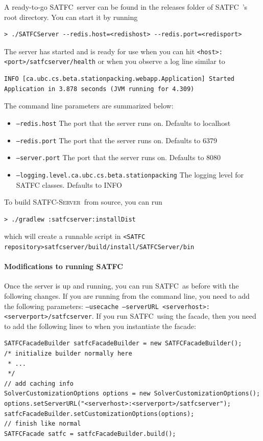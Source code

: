 \documentclass[
10pt, %
letterpaper, %
oneside, %
headinclude,footinclude, %
BCOR5mm, %
needspace, %
]{scrartcl}
\newcommand{\SATFC}{\textsc{SATFC}~}
\newcommand{\SATFCServer}{\textsc{SATFC-Server}~}
\begin{document}
A ready-to-go \SATFC server can be found in the releases folder of \SATFC's root directory. You can start it by running
\begin{lstlisting}[style=Bash]
> ./SATFCServer --redis.host=<redishost> --redis.port=<redisport>
\end{lstlisting}
The server has started and is ready for use when you can hit \texttt{<host>:<port>/satfcserver/health} or when you observe a log line similar to 
\begin{lstlisting}[style=Bash]
INFO [ca.ubc.cs.beta.stationpacking.webapp.Application] Started Application in 3.878 seconds (JVM running for 4.309)
\end{lstlisting}
The command line parameters are summarized below:
\begin{itemize}
\item \texttt{---redis.host} The port that the server runs on. Defaults to localhost
\item \texttt{---redis.port} The port that the server runs on. Defaults to 6379
\item \texttt{---server.port} The port that the server runs on. Defaults to 8080
\item \texttt{---logging.level.ca.ubc.cs.beta.stationpacking} The logging level for SATFC classes. Defaults to INFO
\end{itemize}
To build \SATFCServer from source, you can run 
\begin{lstlisting}[style=Bash]
> ./gradlew :satfcserver:installDist
\end{lstlisting}
which will create a runnable script in \texttt{<SATFC repository>satfcserver/build/install/SATFCServer/bin}

\paragraph{Modifications to running \SATFC}
Once the server is up and running, you can run \SATFC as before with the following changes. If you are running from the command line, you need to add the following parameters: \texttt{---usecache ---serverURL <serverhost>:<serverport>/satfcserver}. If you run \SATFC using the facade, then you need to add the following lines to when you instantiate the facade:

\begin{verbatim}
SATFCFacadeBuilder satfcFacadeBuilder = new SATFCFacadeBuilder();
/* initialize builder normally here
 * ...
 */
// add caching info
SolverCustomizationOptions options = new SolverCustomizationOptions();
options.setServerURL("<serverhost>:<serverport>/satfcserver");
satfcFacadeBuilder.setCustomizationOptions(options);
// finish like normal
SATFCFacade satfc = satfcFacadeBuilder.build();
\end{verbatim}
\end{document}
